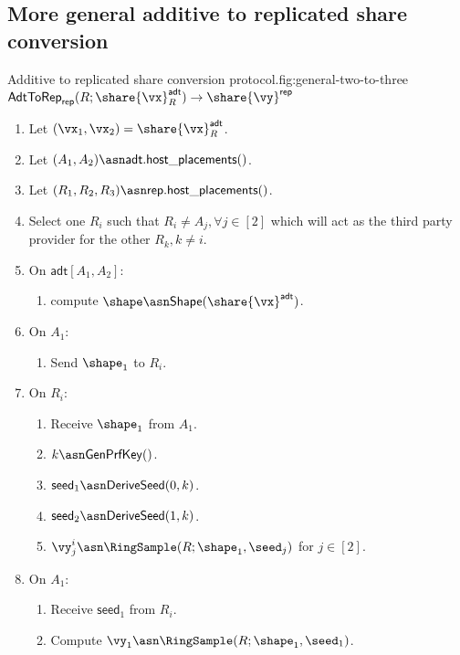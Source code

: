 \subsection{More general additive to replicated share conversion}


\begin{Boxfig}{Additive to replicated share conversion
protocol.}{fig:general-two-to-three}{$\mathsf{AdtToRep}_\mathsf{rep}(R;
\share{\vx}^{\mathsf{adt}}_{R}) \rightarrow \share{\vy}^\mathsf{rep}$}
\begin{enumerate}
\item Let $(\vx_1, \vx_2) = \share{\vx}^{\mathsf{adt}}_{R}$.
\item Let $(A_1, A_2) \asn \mathsf{adt}.\mathsf{host\_placements()}$.
\item Let $(R_1, R_2, R_3) \asn \mathsf{rep}.\mathsf{host\_placements()}$.
\item Select one $R_i$ such that $R_i \neq A_j, \forall j \in [2]$ which will act as the third party provider for the other $R_k, k \neq i$.
\item On $\mathsf{adt}[A_1, A_2]$:
\begin{enumerate}
    \item compute $\shape \asn \mathsf{Shape}(\share{\vx}^{\mathsf{adt}})$.
\end{enumerate}
\item On $A_1$:
\begin{enumerate}
    \item Send $\shape_1$ to $R_i$.
\end{enumerate}
\item On $R_i$:
\begin{enumerate}
    \item Receive $\shape_1$ from $A_1$.
    \item $k \asn \mathsf{GenPrfKey}()$.
    \item $\mathsf{seed}_1 \asn \mathsf{DeriveSeed}(0, k)$.
    \item $\mathsf{seed}_2 \asn \mathsf{DeriveSeed}(1, k)$.
    \item $\vy_j^i \asn \RingSample(R; \shape_1, \seed_j)$ for $j \in [2]$.
\end{enumerate}
\item On $A_1$:
\begin{enumerate}
    \item Receive $\mathsf{seed}_1$ from $R_i$.
    \item Compute $\vy_1 \asn \RingSample(R; \shape_1, \seed_1)$.
\end{enumerate}

\end{enumerate}
\end{Boxfig}
